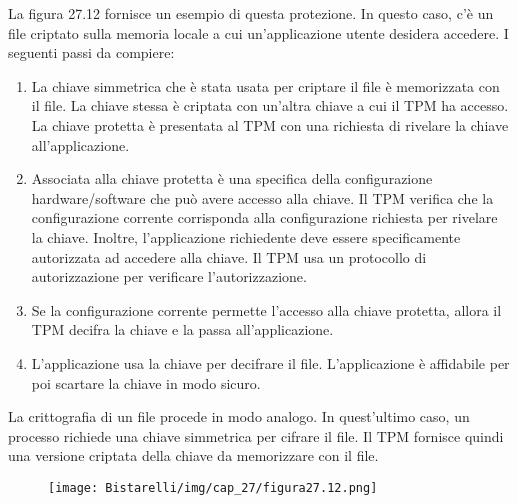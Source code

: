 \singlespacing

La figura 27.12 fornisce un esempio di questa protezione. In questo caso, c'è un file criptato sulla memoria locale a cui un'applicazione utente desidera accedere. I seguenti passi da compiere:

\begin{enumerate}
    \item La chiave simmetrica che è stata usata per criptare il file è memorizzata con il file. La chiave stessa è criptata con un'altra chiave a cui il TPM ha accesso. La chiave protetta è presentata al TPM con una richiesta di rivelare la chiave all'applicazione.
    
    \item Associata alla chiave protetta è una specifica della configurazione hardware/software che può avere accesso alla chiave. Il TPM verifica che la configurazione corrente corrisponda alla configurazione richiesta per rivelare la chiave. Inoltre, l'applicazione richiedente deve essere specificamente autorizzata ad accedere alla chiave. Il TPM usa un protocollo di autorizzazione per verificare l'autorizzazione.
    
    \item Se la configurazione corrente permette l'accesso alla chiave protetta, allora il TPM decifra la chiave e la passa all'applicazione.
    
    \item L'applicazione usa la chiave per decifrare il file. L'applicazione è affidabile per poi scartare la chiave in modo sicuro.
\end{enumerate}
La crittografia di un file procede in modo analogo. In quest'ultimo caso, un processo richiede una chiave simmetrica per cifrare il file. Il TPM fornisce quindi una versione criptata della chiave da memorizzare con il file.

\begin{figure}[H]
	\centering
    \texttt{[image: Bistarelli/img/cap\_27/figura27.12.png]}
\end{figure}

\newpage
